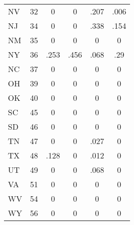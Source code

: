 \begin{table}[htbp]
\begin{tabular}{l*{5}{c}}
NV          &          32&           0&           0&        .207&        .006\\
NJ          &          34&           0&           0&        .338&        .154\\
NM          &          35&           0&           0&           0&           0\\
NY          &          36&        .253&        .456&        .068&         .29\\
NC          &          37&           0&           0&           0&           0\\
OH          &          39&           0&           0&           0&           0\\
OK          &          40&           0&           0&           0&           0\\
SC          &          45&           0&           0&           0&           0\\
SD          &          46&           0&           0&           0&           0\\
TN          &          47&           0&           0&        .027&           0\\
TX          &          48&        .128&           0&        .012&           0\\
UT          &          49&           0&           0&        .068&           0\\
VA          &          51&           0&           0&           0&           0\\
WV          &          54&           0&           0&           0&           0\\
WY          &          56&           0&           0&           0&           0\\
\bottomrule
\end{tabular}
\end{table}

